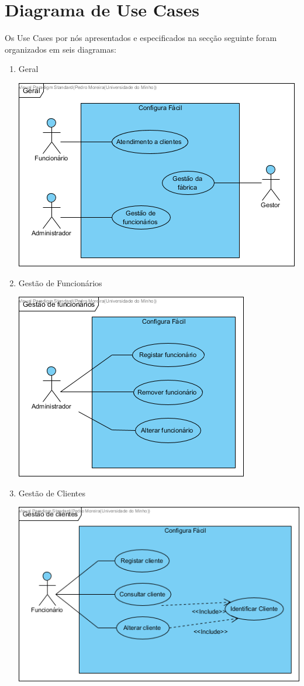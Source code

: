 \documentclass[11pt]{article} %
\begin{document}
\section{Diagrama de Use Cases}
\label{useCases}
Os Use Cases por nós apresentados e especificados na secção seguinte foram organizados em seis diagramas:
\begin{enumerate}
	\item Geral
		\begin{center}
 			\includegraphics[]{Geral.png}
		\end{center}
	\item Gestão de Funcionários
		\begin{center}
 			\includegraphics[]{Gestao_de_funcionarios.png}
		\end{center}\newpage
	\item Gestão de Clientes
		\begin{center}
 			\includegraphics[]{Gestao_de_clientes.png}

\end{center}
\end{enumerate}
\end{document}
